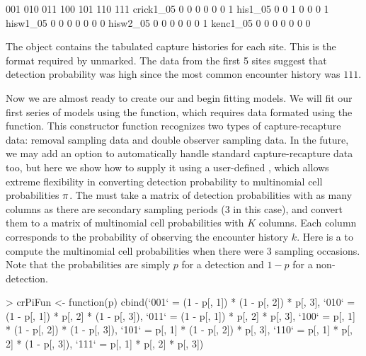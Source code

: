 \documentclass[a4paper]{article}
\renewenvironment{Schunk}{\vspace{\topsep}}{\vspace{\topsep}}
\begin{document}
\begin{Schunk}
\begin{Soutput}
            001 010 011 100 101 110 111
  crick1_05   0   0   0   0   0   0   1
  his1_05     0   0   1   0   0   0   1
  hisw1_05    0   0   0   0   0   0   0
  hisw2_05    0   0   0   0   0   0   1
  kenc1_05    0   0   0   0   0   0   0
\end{Soutput}
\end{Schunk}
The object  contains the tabulated capture histories for
each site. This is the format required by unmarked. The data from
the first 5 sites
suggest that detection probability was high since the most
common encounter history was $111$.

Now we are almost ready to create our  and begin
fitting models. We will fit our first series of models using the
 function, which requires data formated using the
 function. This constructor function
recognizes two types of capture-recapture data: removal sampling
data and double observer sampling data. In the future, we may add an
option to automatically handle standard capture-recapture data too,
but here we show how to supply it using a user-defined ,
which allows extreme flexibility in converting detection probability
to multinomial cell probabilities $\bold \pi$. The  must
take a matrix of detection probabilities with as many columns as there
are secondary sampling periods (3 in this case), and convert them to a
matrix of multinomial
cell probabilities with $K$ columns. Each column corresponds to the
probability of observing the encounter history $k$. Here is a
 to compute the multinomial cell probabilities when there
were 3 sampling occasions. Note that the probabilities are simply $p$
for a detection and $1-p$ for a non-detection.

\begin{Schunk}
\begin{Sinput}
> crPiFun <- function(p) {
     cbind(`001` = (1 - p[, 1]) * (1 - p[, 2]) * p[, 3], 
         `010` = (1 - p[, 1]) * p[, 2] * (1 - p[, 3]), 
         `011` = (1 - p[, 1]) * p[, 2] * p[, 3], `100` = p[, 
             1] * (1 - p[, 2]) * (1 - p[, 3]), `101` = p[, 
             1] * (1 - p[, 2]) * p[, 3], `110` = p[, 1] * 
             p[, 2] * (1 - p[, 3]), `111` = p[, 1] * p[, 
             2] * p[, 3])
 }
\end{Sinput}
\end{Schunk}
\end{document}
